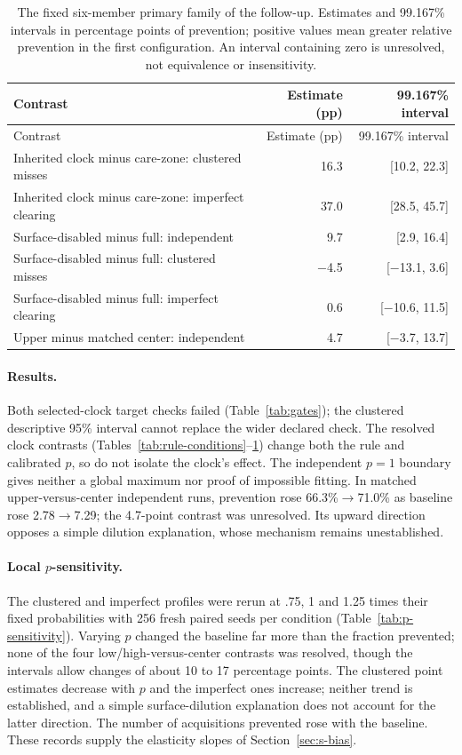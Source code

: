 \documentclass[11pt]{article}
\newcommand{\mn}{\ensuremath{-}}
\begin{document}
{\begin{longtable}{>{\raggedright\arraybackslash}p{.56\linewidth}rr}
\caption{The fixed six-member primary family of the follow-up. Estimates and 99.167\% intervals in percentage points of prevention; positive values mean greater relative prevention in the first configuration. An interval containing zero is unresolved, not equivalence or insensitivity.}\label{tab:rule-contrasts}\\
\toprule
Contrast & Estimate (pp) & 99.167\% interval\\\midrule\endfirsthead
Contrast & Estimate (pp) & 99.167\% interval\\\midrule\endhead
Inherited clock minus care-zone: clustered misses & 16.3 & [10.2, 22.3]\\
Inherited clock minus care-zone: imperfect clearing & 37.0 & [28.5, 45.7]\\
Surface-disabled minus full: independent & 9.7 & [2.9, 16.4]\\
Surface-disabled minus full: clustered misses & $\mn$4.5 & [$\mn$13.1, 3.6]\\
Surface-disabled minus full: imperfect clearing & 0.6 & [$\mn$10.6, 11.5]\\
Upper minus matched center: independent & 4.7 & [$\mn$3.7, 13.7]\\
\bottomrule\end{longtable}
}

\paragraph{Results.} Both selected-clock target checks failed
(Table~\ref{tab:gates}); the clustered descriptive 95\% interval cannot replace
the wider declared check. The resolved clock contrasts
(Tables~\ref{tab:rule-conditions}--\ref{tab:rule-contrasts}) change both the rule
and calibrated $p$, so do not isolate the clock's effect.
The independent $p=1$ boundary gives neither a global maximum nor proof of
impossible fitting. In matched upper-versus-center independent runs, prevention
rose 66.3\%$\to$71.0\% as baseline rose 2.78$\to$7.29; the 4.7-point contrast
was unresolved. Its upward direction opposes a simple dilution explanation,
whose mechanism remains unestablished.

\paragraph{Local $p$-sensitivity.} The clustered and imperfect
profiles were rerun at .75, 1 and 1.25 times their fixed probabilities with 256
fresh paired seeds per condition (Table~\ref{tab:p-sensitivity}). Varying $p$
changed the baseline far more than the fraction prevented; none of the four
low/high-versus-center contrasts was resolved, though the intervals allow changes
of about 10 to 17 percentage points. The clustered point estimates decrease with
$p$ and the imperfect ones increase; neither trend is established, and a simple
surface-dilution explanation does not account for the latter direction. The
number of acquisitions prevented rose with the baseline. These records supply
the elasticity slopes of Section~\ref{sec:s-bias}.
\end{document}
